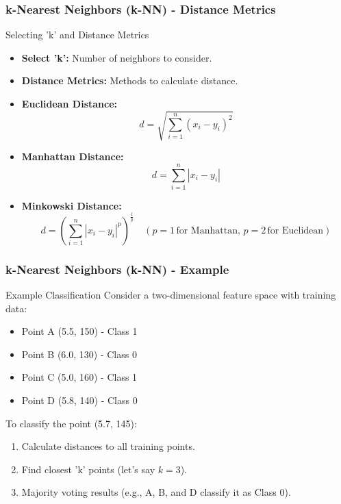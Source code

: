 \documentclass[aspectratio=169]{beamer}
\begin{document}
\begin{frame}[fragile]
    \frametitle{k-Nearest Neighbors (k-NN) - Distance Metrics}
    \begin{block}{Selecting 'k' and Distance Metrics}
        \begin{itemize}
            \item \textbf{Select 'k':} Number of neighbors to consider.
            \item \textbf{Distance Metrics:} Methods to calculate distance.
        \end{itemize}
    \end{block}
    
    \begin{itemize}
        \item \textbf{Euclidean Distance:} 
        \begin{equation}
            d = \sqrt{\sum_{i=1}^{n}(x_i - y_i)^2}
        \end{equation}

        \item \textbf{Manhattan Distance:} 
        \begin{equation}
            d = \sum_{i=1}^{n}|x_i - y_i|
        \end{equation}

        \item \textbf{Minkowski Distance:} 
        \begin{equation}
            d = \left( \sum_{i=1}^{n}|x_i - y_i|^p \right)^{\frac{1}{p}} \quad (p=1 \, \text{for Manhattan, } p=2 \, \text{for Euclidean})
        \end{equation}
    \end{itemize}
\end{frame}

\begin{frame}[fragile]
    \frametitle{k-Nearest Neighbors (k-NN) - Example}
    \begin{block}{Example Classification}
        Consider a two-dimensional feature space with training data:
        \begin{itemize}
            \item Point A (5.5, 150) - Class 1
            \item Point B (6.0, 130) - Class 0
            \item Point C (5.0, 160) - Class 1
            \item Point D (5.8, 140) - Class 0
        \end{itemize}
        To classify the point (5.7, 145):
        \begin{enumerate}
            \item Calculate distances to all training points.
            \item Find closest 'k' points (let's say \(k=3\)).
            \item Majority voting results (e.g., A, B, and D classify it as Class 0).
        \end{enumerate}
    \end{block}
\end{frame}
\end{document}
